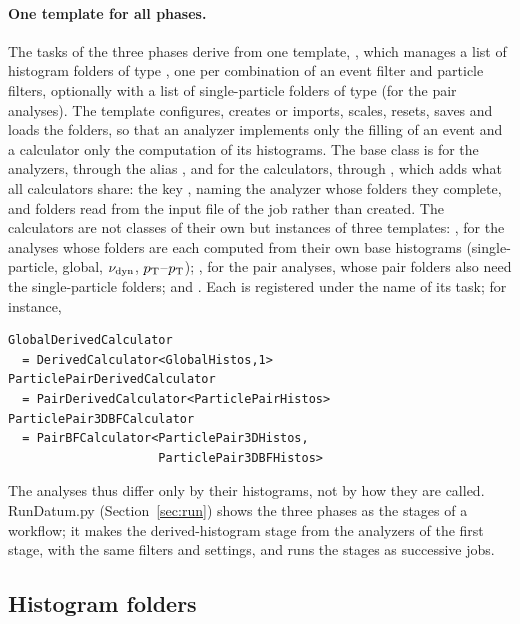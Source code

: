 \paragraph{One template for all phases.}
The tasks of the three phases derive from one template, , which
manages a list of histogram folders of type , one per combination of an event filter and 
particle filters, optionally with a list of single-particle folders of type  (for the pair analyses).
The template configures, creates or imports, scales, resets, saves and loads the folders, so that an analyzer
implements only the filling of an event and a calculator only the computation of its histograms. The base class
 is  for the analyzers, through the alias
, and  for the calculators, through
, which adds what all calculators share: the key ,
naming the analyzer whose folders they complete, and folders read from the input file of the job rather than created.
The calculators are not classes of their own but instances of three templates: ,
for the analyses whose folders are each computed from their own base histograms (single-particle, global,
$\nu_{\mathrm{dyn}}$, $p_{\mathrm{T}}$--$p_{\mathrm{T}}$); , for the pair analyses, whose pair folders also need
the single-particle folders; and . Each is registered under the name of its task;
for instance,
{\footnotesize
\begin{verbatim}
GlobalDerivedCalculator
  = DerivedCalculator<GlobalHistos,1>
ParticlePairDerivedCalculator
  = PairDerivedCalculator<ParticlePairHistos>
ParticlePair3DBFCalculator
  = PairBFCalculator<ParticlePair3DHistos,
                     ParticlePair3DBFHistos>
\end{verbatim}}
\noindent The analyses thus differ only by their histograms, not by how they are called. RunDatum.py (Section~\ref{sec:run}) shows
the three phases as the stages of a workflow; it makes the derived-histogram stage from the analyzers of the first
stage, with the same filters and settings, and runs the stages as successive jobs.

\subsection{Histogram folders}
\label{sec:folders-analysis}

